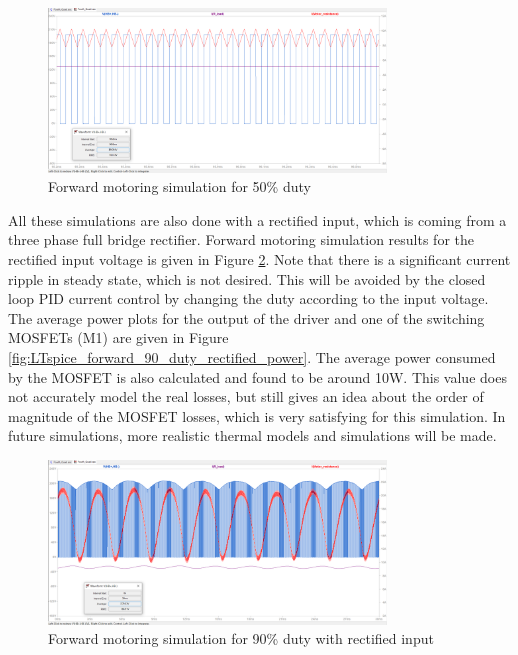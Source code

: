 \begin{figure}[H]
    \centering
    \includegraphics[width=0.8\textwidth]{Figures/Spice_Figures/Motoring_Half_Duty_Sim_1.PNG}
    \caption{Forward motoring simulation for 50\% duty}
    \label{fig:LTspice_forward_50_duty}
\end{figure}

All these simulations are also done with a rectified input, which is coming from a three phase full bridge rectifier. Forward motoring simulation results for the rectified input voltage is given in Figure \ref{fig:LTspice_forward_90_duty_rectified}. Note that there is a significant current ripple in steady state, which is not desired. This will be avoided by the closed loop PID current control by changing the duty according to the input voltage.\\

The average power plots for the output of the driver and one of the switching MOSFETs (M1) are given in Figure \ref{fig:LTspice_forward_90_duty_rectified_power}. The average power consumed by the MOSFET is also calculated and found to be around 10W. This value does not accurately model the real losses, but still gives an idea about the order of magnitude of the MOSFET losses, which is very satisfying for this simulation. In future simulations, more realistic thermal models and simulations will be made.

\begin{figure}[H]
    \centering
    \includegraphics[width=0.8\textwidth]{Figures/Spice_Figures/Motoring_Full_Duty_Rectified_Sim.PNG}
    \caption{Forward motoring simulation for 90\% duty with rectified input}    \label{fig:LTspice_forward_90_duty_rectified}
\end{figure}

